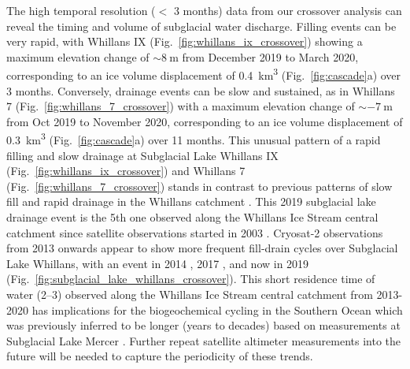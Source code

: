 The high temporal resolution ($<$ 3 months) data from our crossover analysis can reveal the timing and volume of subglacial water discharge. %
Filling events can be very rapid, with Whillans IX (Fig.~\ref{fig:whillans_ix_crossover}) showing a maximum elevation change of $\sim\SI{+8}{\metre}$ from December 2019 to March 2020, corresponding to an ice volume displacement of \SI{0.4}{\kilo\metre\cubed} (Fig.~\ref{fig:cascade}a) over 3 months.
Conversely, drainage events can be slow and sustained, as in Whillans 7 (Fig.~\ref{fig:whillans_7_crossover}) with a maximum elevation change of $\sim\SI{-7}{\metre}$ from Oct 2019 to November 2020, corresponding to an ice volume displacement of \SI{0.3}{\kilo\metre\cubed} (Fig.~\ref{fig:cascade}a) over 11 months.
This unusual pattern of a rapid filling and slow drainage at Subglacial Lake Whillans IX (Fig.~\ref{fig:whillans_ix_crossover}) and Whillans 7 (Fig.~\ref{fig:whillans_7_crossover}) stands in contrast to previous patterns of slow fill and rapid drainage in the Whillans catchment \citep[e.g.][]{SiegfriedEpisodicicevelocity2016,SiegfriedThirteenyearssubglacial2018}.
This 2019 subglacial lake drainage event is the 5th one observed along the Whillans Ice Stream central catchment since satellite observations started in 2003 \citep{SiegfriedThirteenyearssubglacial2018}.
Cryosat-2 observations from 2013 onwards appear to show more frequent fill-drain cycles over Subglacial Lake Whillans, with an event in 2014 \citep{SiegfriedEpisodicicevelocity2016}, 2017 \citep{SiegfriedThirteenyearssubglacial2018}, and now in 2019 (Fig.~\ref{fig:subglacial_lake_whillans_crossover}).
This short residence time of water (\SIrange{2}{3}{\year}) observed along the Whillans Ice Stream central catchment from 2013-2020 has implications for the biogeochemical cycling in the Southern Ocean which was previously inferred to be longer (years to decades) based on measurements at Subglacial Lake Mercer \citep{Vick-MajorsBiogeochemicalConnectivityFreshwater2020,HawkingsEnhancedtraceelement2020}.
Further repeat satellite altimeter measurements into the future \citep[e.g. CRISTAL;][]{KernCopernicusPolarIce2020} will be needed to capture the periodicity of these trends.



